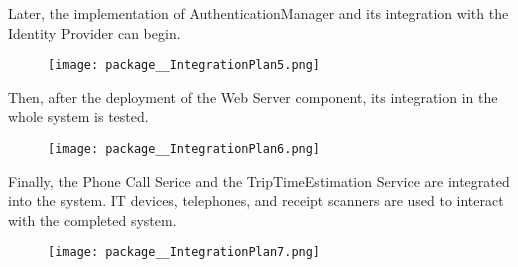 \documentclass[../../main.tex]{subfiles}
\begin{document}
\begin{enumerate}
\begin{minipage}{0.9\textwidth}
	\end{minipage}

	\noindent\begin{minipage}{0.9\textwidth}
		
	\item Later, the implementation of AuthenticationManager and its integration with the Identity Provider can begin. 

	\begin{figure}[H]
    \centering
    \texttt{[image: package\_\_IntegrationPlan5.png]}
	\end{figure}

	\end{minipage}

	\noindent\begin{minipage}{0.9\textwidth}
		
	\item Then, after the deployment of the Web Server component, its integration in the whole system is tested.

	\begin{figure}[H]
    \centering
    \texttt{[image: package\_\_IntegrationPlan6.png]}
	\end{figure}

	\end{minipage}

	\noindent\begin{minipage}{0.9\textwidth}
		
	\item Finally, the Phone Call Serice and the TripTimeEstimation Service are integrated into the system. IT devices, telephones, and receipt scanners are used to interact with the completed system.

	\begin{figure}[H]
    \centering
    \texttt{[image: package\_\_IntegrationPlan7.png]}
	\end{figure}

	\end{minipage}

\end{enumerate}
\end{document}
